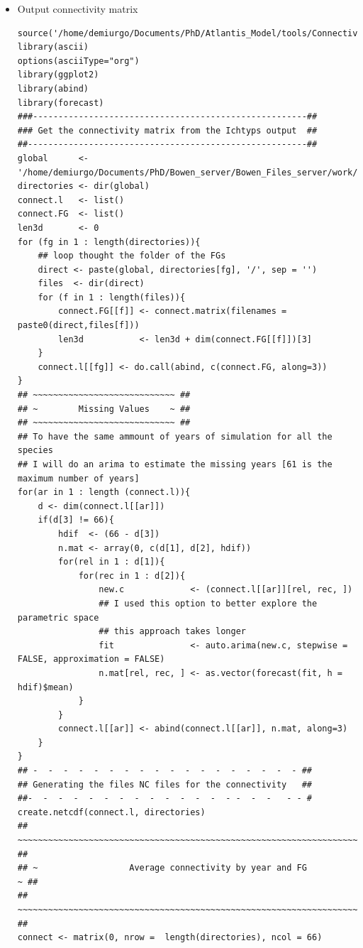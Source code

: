 \documentclass[11pt]{article}
\begin{document}
\begin{itemize}
\begin{itemize}
\item Output connectivity matrix\\
\label{sec-5-2-1-10-1-3}%
\begin{verbatim}
source('/home/demiurgo/Documents/PhD/Atlantis_Model/tools/Connectivity/Cnect.tools.R')
library(ascii)
options(asciiType="org")
library(ggplot2)
library(abind)
library(forecast)
###------------------------------------------------------##
### Get the connectivity matrix from the Ichtyps output  ##
##-------------------------------------------------------##
global      <- '/home/demiurgo/Documents/PhD/Bowen_server/Bowen_Files_server/work/JFRE_Files/Output/'
directories <- dir(global)
connect.l   <- list()
connect.FG  <- list()
len3d       <- 0
for (fg in 1 : length(directories)){
    ## loop thought the folder of the FGs
    direct <- paste(global, directories[fg], '/', sep = '')
    files  <- dir(direct)
    for (f in 1 : length(files)){
        connect.FG[[f]] <- connect.matrix(filenames = paste0(direct,files[f]))
        len3d           <- len3d + dim(connect.FG[[f]])[3]
    }
    connect.l[[fg]] <- do.call(abind, c(connect.FG, along=3))
}
## ~~~~~~~~~~~~~~~~~~~~~~~~~~~~ ##
## ~        Missing Values    ~ ##
## ~~~~~~~~~~~~~~~~~~~~~~~~~~~~ ##
## To have the same ammount of years of simulation for all the species
## I will do an arima to estimate the missing years [61 is the maximum number of years]
for(ar in 1 : length (connect.l)){
    d <- dim(connect.l[[ar]])
    if(d[3] != 66){
        hdif  <- (66 - d[3])
        n.mat <- array(0, c(d[1], d[2], hdif))
        for(rel in 1 : d[1]){
            for(rec in 1 : d[2]){
                new.c             <- (connect.l[[ar]][rel, rec, ])
                ## I used this option to better explore the parametric space
                ## this approach takes longer
                fit               <- auto.arima(new.c, stepwise = FALSE, approximation = FALSE)
                n.mat[rel, rec, ] <- as.vector(forecast(fit, h = hdif)$mean)
            }
        }
        connect.l[[ar]] <- abind(connect.l[[ar]], n.mat, along=3)
    }
}
## -  -  -  -  -  -  -  -  -  -  -  -  -  -  -  -  -  - ##
## Generating the files NC files for the connectivity   ##
##-  -  -  -  -  -  -  -  -  -  -  -  -  - -  -  -   - - #
create.netcdf(connect.l, directories)
## ~~~~~~~~~~~~~~~~~~~~~~~~~~~~~~~~~~~~~~~~~~~~~~~~~~~~~~~~~~~~~~~~~~~~~~ ##
## ~                  Average connectivity by year and FG               ~ ##
## ~~~~~~~~~~~~~~~~~~~~~~~~~~~~~~~~~~~~~~~~~~~~~~~~~~~~~~~~~~~~~~~~~~~~~~ ##
connect <- matrix(0, nrow =  length(directories), ncol = 66)

\end{verbatim}
\end{itemize}
\end{itemize}
\end{document}

